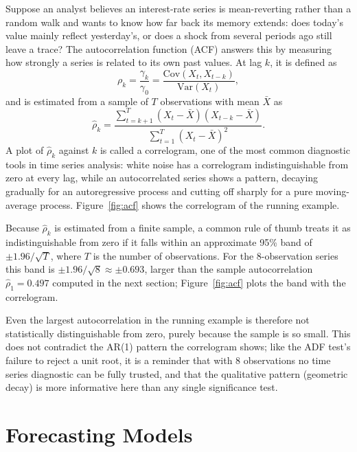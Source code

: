 \documentclass[../ai_in_finance]{subfiles}
\begin{document}
Suppose an analyst believes an interest-rate series is mean-reverting rather than a random walk and wants to know how far back its memory extends: does today's value mainly reflect yesterday's, or does a shock from several periods ago still leave a trace? The autocorrelation function (ACF) answers this by measuring how strongly a series is related to its own past values. At lag $k$, it is defined as
\begin{equation}
\label{eq:timeseries-acf}
\rho_k = \frac{\gamma_k}{\gamma_0} = \frac{\text{Cov}(X_t, X_{t-k})}{\text{Var}(X_t)},
\end{equation}
and is estimated from a sample of $T$ observations with mean $\bar X$ as
\begin{equation*}
\hat\rho_k = \frac{\sum_{t=k+1}^{T} (X_t - \bar X)(X_{t-k} - \bar X)}{\sum_{t=1}^{T} (X_t - \bar X)^2}.
\end{equation*}
A plot of $\hat\rho_k$ against $k$ is called a correlogram, one of the most common diagnostic tools in time series analysis: white noise has a correlogram indistinguishable from zero at every lag, while an autocorrelated series shows a pattern, decaying gradually for an autoregressive process and cutting off sharply for a pure moving-average process. Figure~\ref{fig:acf} shows the correlogram of the running example.

Because $\hat\rho_k$ is estimated from a finite sample, a common rule of thumb treats it as indistinguishable from zero if it falls within an approximate 95\% band of $\pm 1.96/\sqrt{T}$, where $T$ is the number of observations. For the 8-observation series this band is $\pm 1.96/\sqrt{8} \approx \pm 0.693$, larger than the sample autocorrelation $\hat\rho_1 = 0.497$ computed in the next section; Figure~\ref{fig:acf} plots the band with the correlogram.

Even the largest autocorrelation in the running example is therefore not statistically distinguishable from zero, purely because the sample is so small. This does not contradict the AR(1) pattern the correlogram shows; like the ADF test's failure to reject a unit root, it is a reminder that with 8 observations no time series diagnostic can be fully trusted, and that the qualitative pattern (geometric decay) is more informative here than any single significance test.

\section{Forecasting Models}
\end{document}
